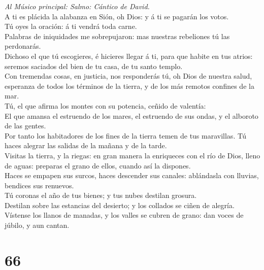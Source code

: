  \emph{Al Músico principal: Salmo: Cántico de David.}\\
A ti es plácida la alabanza en Sión, oh Dios: y á ti se pagarán los
votos.\\
 Tú oyes la oración: á ti vendrá toda carne.\\
 Palabras de iniquidades me sobrepujaron: mas nuestras
rebeliones tú las perdonarás.\\
 Dichoso el que tú escogieres, é hicieres llegar á ti, para
que habite en tus atrios: seremos saciados del bien de tu casa, de tu
santo templo.\\
 Con tremendas cosas, en justicia, nos responderás tú, oh
Dios de nuestra salud, esperanza de todos los términos de la tierra, y
de los más remotos confines de la mar.\\
 Tú, el que afirma los montes con su potencia, ceñido de
valentía:\\
 El que amansa el estruendo de los mares, el estruendo de
sus ondas, y el alboroto de las gentes.\\
 Por tanto los habitadores de los fines de la tierra temen
de tus maravillas. Tú haces alegrar las salidas de la mañana y de la
tarde.\\
 Visitas la tierra, y la riegas: en gran manera la
enriqueces con el río de Dios, lleno de aguas: preparas el grano de
ellos, cuando así la dispones.\\
 Haces se empapen sus surcos, haces descender sus canales:
ablándasla con lluvias, bendices sus renuevos.\\
 Tú coronas el año de tus bienes; y tus nubes destilan
grosura.\\
 Destilan sobre las estancias del desierto; y los collados
se ciñen de alegría.\\
 Vístense los llanos de manadas, y los valles se cubren de
grano: dan voces de júbilo, y aun cantan.

\hypertarget{section-65}{%
\section{66}\label{section-65}}

